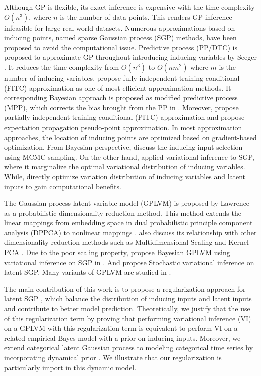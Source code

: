 \documentclass{article}
\begin{document}
Although GP is flexible, its exact inference is expensive with the time complexity $O(n^3)$, where $n$ is the number of data points. This renders GP inference infeasible for large real-world datasets. Numerous approximations based on inducing points, named sparse Gaussian process (SGP) methods, have been proposed to avoid the computational issue. Predictive process (PP/DTC) is proposed to approximate GP throughout introducing inducing variables by Seeger \citep{Seeger_2003}. It reduces the time complexity from $O(n^3)$ to $O(nm^2)$ where $m$ is the number of inducing variables. \cite{Snelson_2006} propose fully independent training conditional (FITC) approximation as one of most efficient approximation methods. It corresponding Bayesian approach is proposed as modified predictive process (MPP), which corrects the bias brought from the PP in \cite{Finley_2009}. Moreover, \cite{Snelson_2007} propose partially independent training conditional (PITC) approximation and \cite{Csato_2002} propose expectation propagation pseudo-point approximation. In most approximation approaches, the location of inducing points are optimized based on gradient-based optimization. From Bayesian perspective, \cite{Raj_2011} discuss the inducing input selection using MCMC sampling. On the other hand, \cite{Titsias_2009} applied variational inference to SGP, where it marginalize the optimal variational distribution of inducing variables. While, \cite{Hensman_2012, Hensman_2013} directly optimize variation distribution of inducing variables and latent inputs to gain computational benefits.

The Gaussian process latent variable model (GPLVM) \citep{Lawrence_2003} is proposed by Lawrence as a probabilistic dimensionality reduction method. This method extends the linear mappings from embedding space in dual probabilistic principle component analysis (DPPCA) to nonlinear mappings \citep{Lawrence_2003, Lawrence_2005}. \cite{Lawrence_2005} also discuss its relationship with other dimensionality reduction methods such as Multidimensional Scaling \citep{Mardia_1979} and Kernel PCA \citep{Scholkopf_1998}. Due to the poor scaling property, \cite{Titsias_2010} propose Bayesian GPLVM using variational inference on SGP in \cite{Titsias_2009}. And \cite{Hensman_2013} propose Stochastic variational inference on latent SGP. Many variants of GPLVM are studied in \cite{Lawrence_2007_HGP, Lawrence_2006, Urtasun_2007}.

The main contribution of this work is to propose a regularization approach for latent SGP \citep{Hensman_2013}, which balance the distribution of inducing inputs and latent inputs and contribute to better model prediction. Theoretically, we justify that the use of this regularization term by proving that performing variational inference (VI) on a GPLVM with this regularization term is equivalent to perform VI on a related empirical Bayes model with a prior on inducing inputs. Moreover, we extend categorical latent Gaussian process \citep{Gal_2015} to modeling categorical time series by incorporating dynamical prior \citep{Damianou_2016}. We illustrate that our regularization is particularly import in this dynamic model.
\end{document}
